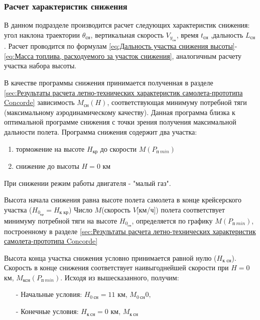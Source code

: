 \subsubsection{Расчет характеристик снижения}

В данном подразделе производится расчет следующих характеристик
снижения: угол наклона траектории $\theta_\text{сн}$, вертикальная скорость $V_{y_\text{сн}}$, время $t_\text{сн}$ ,дальность $L_\text{сн}$. Расчет проводится по формулам \ref{eq:Дальность участка снижения высоты}-\ref{eq:Масса топлива, расходуемого за участок снижения}, аналогичным расчету участка набора высоты. 

В качестве программы снижения принимается полученная в разделе \ref{sec:Результаты расчета летно-технических характеристик самолета-прототипа Concorde} зависимость $M_\text{сн}(H)$, соответствующая минимуму потребной тяги (максимальному аэродинамическому качеству). Данная программа близка к оптимальной программе снижения с точки зрения получения максимальной дальности полета. 
Программа снижения содержит два участка:
\begin{enumerate}
    \item торможение на высоте $H_\text{кр}$ до скорости $M(P_{\text{п} \ min})$
    \item снижение до высоты $H = 0$ км
\end{enumerate} 

При снижении режим работы двигателя - "малый газ". 

Высота начала снижения равна высоте полета самолета в конце крейсерского участка ($H_{0_\text{кр}} = H_\text{к \ кр}$) Число $M$(скорость $V$[км/ч]) полета соответствует минимуму потребной тяги на высоте $H_{0_\text{сн}}$, определяется по графику $M(P_{\text{п} \ min})$, построенному в разделе \ref{sec:Результаты расчета летно-технических характеристик самолета-прототипа Concorde}

Высота конца участка снижения условно принимается равной нулю ($H_\text{к \ сн}$). Скорость в конце снижения соответствует наивыгоднейшей скорости при $H = 0$ км, $M_\text{ксн}(P_{\text{п} \ min})$.  Исходя из вышесказанного, получим:
\begin{itemize}
    \item [-] Начальные условия: $H_{0 \ \text{сн}} = 11$ км, $M_{0 \ \text{сн}} 0,$
    \item [-] Конечные условия: $H_{\text{к} \ \text{сн}} = 0$ км, $M_{\text{к} \ \text{сн}}$
\end{itemize}

